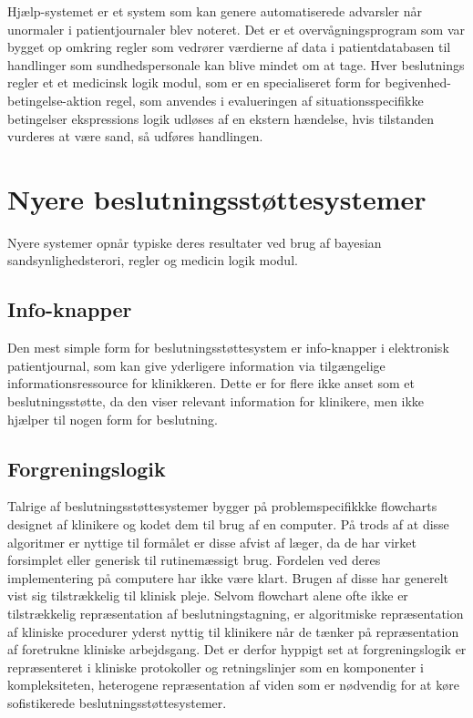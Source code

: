 Hjælp-systemet er et system som kan genere automatiserede advarsler når unormaler i patientjournaler blev noteret. Det er et overvågningsprogram som var bygget op omkring regler som vedrører værdierne af data i patientdatabasen til handlinger som sundhedspersonale kan blive mindet om at tage. Hver beslutnings regler et et medicinsk logik modul, som er en specialiseret form for begivenhed-betingelse-aktion regel, som anvendes i evalueringen af situationsspecifikke betingelser ekspressions logik udløses af en ekstern hændelse, hvis tilstanden vurderes at være sand, så udføres handlingen.  \citep{Masys2006}

\section{Nyere beslutningsstøttesystemer}
Nyere systemer opnår typiske deres resultater ved brug af bayesian sandsynlighedsterori, regler og medicin logik modul.

\subsection{Info-knapper}
Den mest simple form for beslutningsstøttesystem er info-knapper i elektronisk patientjournal, som kan give yderligere information via tilgængelige informationsressource for klinikkeren. Dette er for flere ikke anset som et beslutningsstøtte, da den viser relevant information for klinikere, men ikke hjælper til nogen form for beslutning.  \citep{Masys2006}

\subsection{Forgreningslogik}
Talrige af beslutningsstøttesystemer bygger på problemspecifikkke flowcharts designet af klinikere og kodet dem til brug af en computer. På trods af at disse algoritmer er nyttige til formålet er disse afvist af læger, da de har virket forsimplet eller generisk til rutinemæssigt brug. Fordelen ved deres implementering på computere har ikke være klart. Brugen af disse har generelt vist sig tilstrækkelig til klinisk pleje. Selvom flowchart alene ofte ikke er tilstrækkelig repræsentation af beslutningstagning, er algoritmiske repræsentation af kliniske procedurer yderst nyttig til klinikere når de tænker på repræsentation af foretrukne kliniske arbejdsgang. Det er derfor hyppigt set at forgreningslogik er repræsenteret i kliniske protokoller og retningslinjer som en komponenter i kompleksiteten, heterogene repræsentation af viden som er nødvendig for at køre sofistikerede beslutningsstøttesystemer. \citep{Masys2006a}

